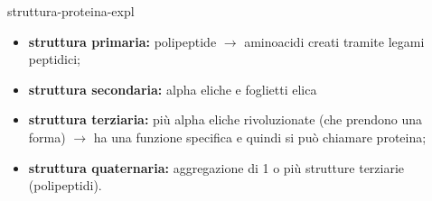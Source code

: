 \documentclass[preview]{standalone}
\begin{document}


\begin{snippet}{struttura-proteina-expl}
    \begin{itemize}
        \item \textbf{struttura primaria:} polipeptide \(\rightarrow\) aminoacidi creati tramite legami peptidici;
        \item \textbf{struttura secondaria:} alpha eliche e foglietti elica
        \item \textbf{struttura terziaria:} più alpha eliche rivoluzionate (che prendono una forma) \(\rightarrow\) ha una funzione specifica
        e quindi si può chiamare proteina;
        \item \textbf{struttura quaternaria:} aggregazione di 1 o più strutture terziarie (polipeptidi).
    \end{itemize}
\end{snippet}
\end{document}
